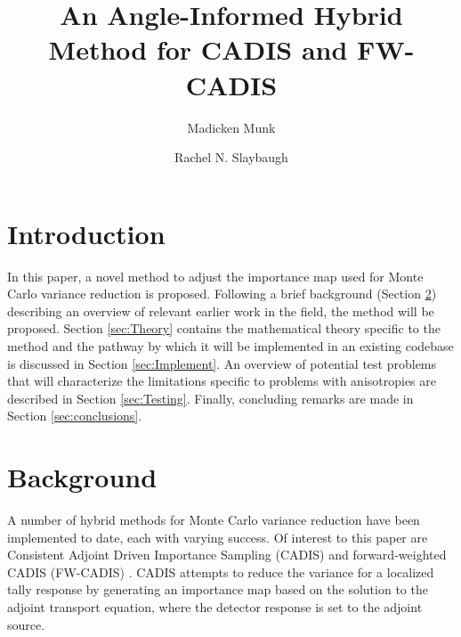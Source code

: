 \documentclass{mc2015}
\begin{document}
\title{An Angle-Informed Hybrid Method for CADIS and FW-CADIS}

\author{Madicken Munk}
\author{Rachel N. Slaybaugh}

\maketitle

\section{Introduction}

In this paper, a novel method to adjust the importance map used for Monte Carlo variance reduction is proposed. Following a brief background (Section \ref{sec:Background}) describing an overview of relevant earlier work in the field, the method will be proposed.  
Section \ref{sec:Theory} contains the mathematical theory specific to the method and the pathway by which it will be implemented in an existing codebase is discussed in Section \ref{sec:Implement}. 
An overview of potential test problems that will characterize the limitations specific to problems with anisotropies are described in Section \ref{sec:Testing}. 
Finally, concluding remarks are made in Section \ref{sec:conclusions}.  

\section{Background}
\label{sec:Background}

A number of hybrid methods for Monte Carlo variance reduction have been implemented to date, each with varying success. Of interest to this paper are Consistent Adjoint Driven Importance Sampling (CADIS) \cite{wagner_automatic_1997,wagner_automated_1998,haghighat_monte_2003} and forward-weighted CADIS (FW-CADIS) \cite{wagner_forward-weighted_2007,wagner_forward-weighted_2009,wagner_forward-weighted_2010}. CADIS attempts to reduce the variance for a localized tally response by generating an importance map based on the solution to the adjoint transport equation, where the detector response is set to the adjoint source. 
\end{document}
